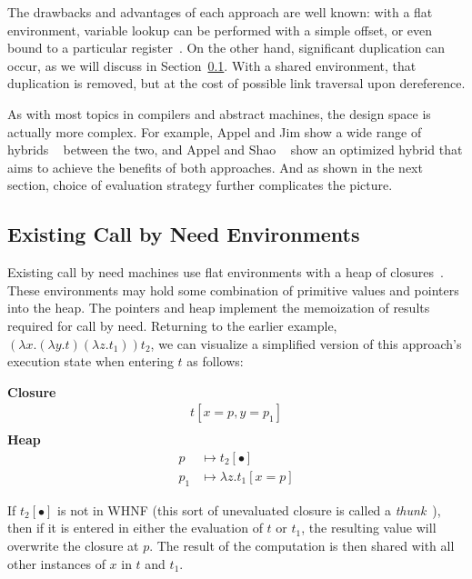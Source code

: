 The drawbacks and advantages of each approach are well known: with a flat
environment, variable lookup can be performed with a simple offset, or even
bound to a particular register~\cite{jonesstg,appel2006compiling}. On the other
hand, significant duplication can occur, as we will discuss in Section~\ref{sec:exist}.
With a shared environment, that duplication is removed, but at the cost of
possible link traversal upon dereference. 

As with most topics in compilers and abstract machines, the design space is
actually more complex. For example, Appel and Jim show a wide range of hybrids
~\cite{appel1988optimizing} between the two, and Appel and Shao
~\cite{shao1994space} show an optimized hybrid that aims to achieve the benefits
of both approaches. And as shown in the next section, choice of evaluation
strategy further complicates the picture.

\subsection{Existing Call by Need Environments} \label{sec:exist}

Existing call by need machines use flat environments with a heap of
closures~\cite{jonesstg,TIM,johnsson1984efficient,boquist1997grin}. These
environments may hold some combination of primitive values and pointers into the
heap. The pointers and heap implement the memoization of results required for
call by need. Returning to the earlier example, $(\lambda x.(\lambda y.t)
(\lambda z.t_1)) t_2$, we can visualize a simplified version of this approach's
execution state when entering $t$ as follows:

\begin{center}
\textbf{Closure}
\begin{align*}
t[x=p, y=p_1] \\
\end{align*}
\textbf{Heap}
\begin{align*}
p &\mapsto t_2[\bullet] \\
p_1 &\mapsto \lambda z.t_1[x=p] 
\end{align*}
\end{center}

If $t_2[\bullet]$ is not in WHNF (this sort of unevaluated closure is called a
\emph{thunk}~\cite{ingerman1961way,peyton1992implementing}), then if it is
entered in either the evaluation of $t$ or $t_1$, the resulting value will
overwrite the closure at $p$. The result of the computation is then shared with
all other instances of $x$ in $t$ and $t_1$. 

